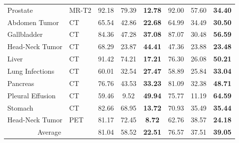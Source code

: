 \documentclass[runningheads]{llncs}
\begin{document}
\begin{table}[]
\begin{tabular}{llccc|ccc}
Prostate                             & MR-T2                     & 92.18 & 79.39 & \textbf{12.78} & 92.00 & 57.60 & \textbf{34.40} \\
Abdomen Tumor                        & CT                        & 65.54 & 42.86 & \textbf{22.68} & 64.99 & 34.49 & \textbf{30.50} \\
Gallbladder                          & CT                        & 84.36 & 47.28 & \textbf{37.08} & 87.07 & 30.48 & \textbf{56.59} \\
Head-Neck Tumor                      & CT                        & 68.29 & 23.87 & \textbf{44.41} & 47.36 & 23.88 & \textbf{23.48} \\
Liver                                & CT                        & 91.42 & 74.21 & \textbf{17.21} & 76.30 & 26.08 & \textbf{50.21} \\
Lung Infections                      & CT                        & 60.01 & 32.54 & \textbf{27.47} & 58.89 & 25.84 & \textbf{33.04} \\
Pancreas                             & CT                        & 76.76 & 43.53 & \textbf{33.23} & 81.09 & 32.38 & \textbf{48.71} \\
Pleural Effusion                     & CT                        & 59.46 & 9.52  & \textbf{49.94} & 75.77 & 11.19 & \textbf{64.59} \\
Stomach                              & CT                        & 82.66 & 68.95 & \textbf{13.72} & 70.93 & 35.49 & \textbf{35.44} \\
Head-Neck Tumor                      & PET                       & 81.17 & 72.45 & \textbf{8.72}  & 62.76 & 38.57 & \textbf{24.18} \\ \hline
\multicolumn{2}{c}{Average}                                      & 81.04 & 58.52 & \textbf{22.51} & 76.57 & 37.51 & \textbf{39.05} \\ \hline
\end{tabular}
\end{table}
\end{document}
